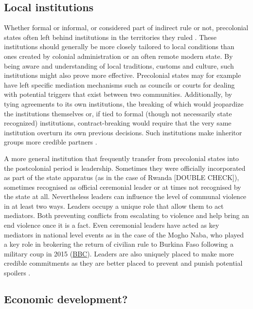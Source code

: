 \documentclass[12pt]{article}
\begin{document}
\subsection{Local institutions}

Whether formal or informal, or considered part of indirect rule or not,
precolonial states often left behind institutions in the territories they ruled
\citep{Wig2016, Wig2018}. These institutions should generally be more closely
tailored to local conditions than ones created by colonial administration or an
often remote modern state. By being aware and understanding of local traditions,
customs and culture, such institutions might also prove more effective.
Precolonial states may for example have left specific mediation mechanisms such
as councils or courts for dealing with potential triggers that exist between two
communities. Additionally, by tying agreements to its own institutions,
the breaking of which would jeopardize the institutions themselves or, if tied
to formal (though not necessarily state recognized) institutions,
contract-breaking would require that the very same institution overturn its
own previous decisions. Such institutions make inheritor groups more credible
partners \citep{Wig2018}.


A more general institution that frequently transfer from precolonial states into
the postcolonial period is leadership. Sometimes they were officially
incorporated as part of the state apparatus (as in the case of Rwanda [DOUBLE
CHECK]), sometimes recognised as official ceremonial leader or at times not
recognised by the state at all. Nevertheless leaders can influence the level of
communal violence in at least two ways. Leaders occupy a unique role that
allow them to act mediators. Both preventing conflicts from escalating to
violence and help bring an end violence once it is a fact. Even ceremonial
leaders have acted as key mediators in national level events as in the case of
the Mogho Naba, who played a key role in brokering the return of civilian rule to
Burkina Faso following a military coup in 2015
(\href{https://www.bbc.com/news/world-africa-34340704}{BBC}). Leaders are also
uniquely placed to make more credible commitments as they are better placed to
prevent and punish potential spoilers \citep{Wig2016}.


\subsection{Economic development?}
\end{document}
